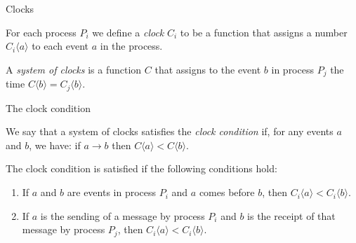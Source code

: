 \documentclass[12pt]{beamer}
\begin{document}
    \begin{frame}{Clocks}
        \begin{definition}[Clock]
            For each process \(P_i\) we define a \emph{clock} \(C_i\) to be a
            function that assigns a number \(C_i\langle a\rangle\) to
            each event \(a\) in the process.
        \end{definition}

        \begin{definition}
            A \emph{system of clocks} is a function \(C\) that assigns to the
            event \(b\) in process \(P_j\) the time \(C\langle b\rangle =
            C_j\langle b\rangle\).
        \end{definition}
    \end{frame}

    \begin{frame}{The clock condition}
        \begin{definition}
            We say that a system of clocks satisfies the \emph{clock condition}
            if, for any events \(a\) and \(b\), we have: if \(a\rightarrow b\)
            then \(C\langle a\rangle < C\langle b\rangle\).
        \end{definition}

        \begin{lemma}
            The clock condition is satisfied if the following conditions hold:
            \begin{enumerate}
                \item If \(a\) and \(b\) are events in process \(P_i\) and \(a\)
                comes before \(b\), then \(C_i\langle a\rangle < C_i\langle b\rangle\).
                \item If \(a\) is the sending of a message by process \(P_i\) and \(b\)
                is the receipt of that message by process \(P_j\), then
                \(C_i\langle a\rangle < C_i\langle b\rangle\).
            \end{enumerate}
        \end{lemma}
    \end{frame}
\end{document}
